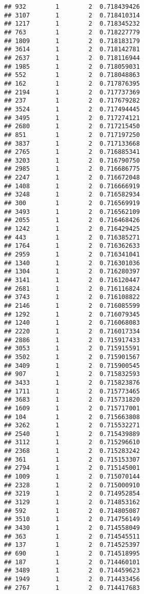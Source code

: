 \documentclass[
]{article}
\begin{document}
\begin{verbatim}
## 932        1        2  0.718439426
## 3107       1        2  0.718410314
## 1217       1        2  0.718345232
## 763        1        2  0.718227779
## 1809       1        2  0.718183179
## 3614       1        2  0.718142781
## 2637       1        2  0.718116944
## 1985       1        2  0.718059031
## 552        1        2  0.718048863
## 162        1        2  0.717876395
## 2194       1        2  0.717737369
## 237        1        2  0.717679282
## 3524       1        2  0.717494445
## 3495       1        2  0.717274121
## 2680       1        2  0.717215450
## 851        1        2  0.717197250
## 3837       1        2  0.717133668
## 2765       1        2  0.716885341
## 3203       1        2  0.716790750
## 2985       1        2  0.716686775
## 2247       1        2  0.716672048
## 1408       1        2  0.716666919
## 3248       1        2  0.716582934
## 300        1        2  0.716569919
## 3493       1        2  0.716562109
## 2055       1        2  0.716468426
## 1242       1        2  0.716429425
## 443        1        2  0.716385271
## 1764       1        2  0.716362633
## 2959       1        2  0.716341041
## 1340       1        2  0.716301036
## 1304       1        2  0.716280397
## 3141       1        2  0.716120447
## 2681       1        2  0.716116824
## 3743       1        2  0.716108822
## 2146       1        2  0.716085599
## 1292       1        2  0.716079345
## 1240       1        2  0.716068083
## 2220       1        2  0.716017334
## 2886       1        2  0.715917433
## 3053       1        2  0.715915591
## 3502       1        2  0.715901567
## 3409       1        2  0.715900545
## 907        1        2  0.715832593
## 3433       1        2  0.715823876
## 1711       1        2  0.715773465
## 3683       1        2  0.715731820
## 1609       1        2  0.715717001
## 104        1        2  0.715663808
## 3262       1        2  0.715532271
## 2540       1        2  0.715439889
## 3112       1        2  0.715296610
## 2368       1        2  0.715283242
## 361        1        2  0.715153307
## 2794       1        2  0.715145001
## 1009       1        2  0.715070144
## 2328       1        2  0.715000910
## 3219       1        2  0.714952854
## 3129       1        2  0.714853162
## 592        1        2  0.714805087
## 3510       1        2  0.714756149
## 3430       1        2  0.714558049
## 363        1        2  0.714545511
## 137        1        2  0.714525397
## 690        1        2  0.714518995
## 187        1        2  0.714460101
## 3489       1        2  0.714459623
## 1949       1        2  0.714433456
## 2767       1        2  0.714417683

\end{verbatim}
\end{document}
